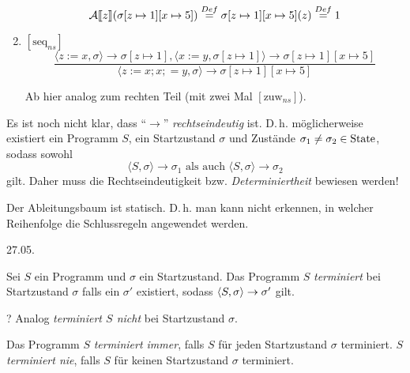 \begin{example}
\begin{enumerate}
            \[
            \mathcal{A}\mathrm{[}\kern-.14em\mathrm{[} z\mathrm{]}\kern-.14em\mathrm{]}(\sigma[z \mapsto 1][x \mapsto 5]) \overset{Def}{=} \sigma[z \mapsto 1][x \mapsto 5](z) \overset{Def}{=} 1
            \]

        \item $[\text{seq}_{ns}]$
            \[
            \frac{\langle z := x, \sigma \rangle \to \sigma[z \mapsto 1], \langle x := y, \sigma[z \mapsto 1] \rangle \to \sigma[z \mapsto 1][x \mapsto 5]}{\langle z := x; x ;= y, \sigma \rangle \to \sigma[z \mapsto 1][x \mapsto 5]}
            \]

            Ab hier analog zum rechten Teil (mit zwei Mal $[\text{zuw}_{ns}]$).
    \end{enumerate}
\end{example}

\par\bigskip
\begin{remark}
    Es ist noch nicht klar, dass ``$\to$'' \emph{rechtseindeutig} ist. D.\,h. möglicherweise existiert ein Programm $S$, ein Startzustand $\sigma$ und Zustände $\sigma_1 \neq \sigma_2 \in \operatorname{State}$, sodass sowohl
    \[
    \langle S, \sigma \rangle \to \sigma_1 \text{ als auch } \langle S, \sigma \rangle \to \sigma_2
    \]
    gilt. Daher muss die Rechtseindeutigkeit bzw. \emph{Determiniertheit} bewiesen werden!
\end{remark}

\par\medskip
\begin{remark}[Ableitungsbaum]
    Der Ableitungsbaum ist statisch. D.\,h. man kann nicht erkennen, in welcher Reihenfolge die Schlussregeln angewendet werden.
\end{remark}



\newpage
\hfill 27.05.
\begin{definition}
    Sei $S$ ein Programm und $\sigma$ ein Startzustand. Das Programm $S$ \emph{terminiert} bei Startzustand $\sigma$ falls ein $\sigma'$ existiert, sodass $\langle S, \sigma \rangle \to \sigma'$ gilt.

    ? Analog \emph{terminiert $S$ nicht} bei Startzustand $\sigma$.

    Das Programm $S$ \emph{terminiert immer}, falls $S$ für jeden Startzustand $\sigma$ terminiert. $S$ \emph{terminiert nie}, falls $S$ für keinen Startzustand $\sigma$ terminiert.
\end{definition}


